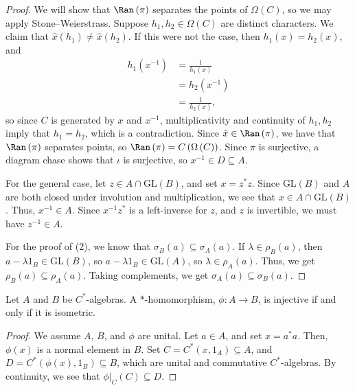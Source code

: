 \documentclass[10pt]{mypackage}
\newcommand{\GL}{\text{GL}}
\begin{document}
\begin{proof}
  We will show that $\Ran\left(\pi\right)$ separates the points of $\Omega\left(C\right)$, so we may apply Stone--Weierstrass. Suppose $h_1,h_2\in \Omega\left(C\right)$ are distinct characters. We claim that $\hat{x}\left(h_1\right) \neq \hat{x}\left(h_2\right)$. If this were not the case, then $h_1\left(x\right) = h_2\left(x\right)$, and
  \begin{align*}
    h_1\left(x^{-1}\right) &= \frac{1}{h_1\left(x\right)}\\
                           &= h_2\left(x^{-1}\right)\\
                           &= \frac{1}{h_2\left(x\right)},
  \end{align*}
  so since $C$ is generated by $x$ and $x^{-1}$, multiplicativity and continuity of $h_1,h_2$ imply that $h_1 = h_2$, which is a contradiction. Since $\hat{x}\in \Ran\left(\pi\right)$, we have that $\Ran\left(\pi\right)$ separates points, so $\Ran\left(\pi\right) = C\left(\Omega\left(C\right)\right)$. Since $\pi$ is surjective, a diagram chase shows that $\iota$ is surjective, so $x^{-1}\in D\subseteq A$.\newline

  For the general case, let $z\in A\cap \GL\left(B\right)$, and set $x = z^{\ast}z$. Since $\GL\left(B\right)$ and $A$ are both closed under involution and multiplication, we see that $x\in A\cap \GL\left(B\right)$. Thus, $x^{-1}\in A$. Since $x^{-1}z^{\ast}$ is a left-inverse for $z$, and $z$ is invertible, we must have $z^{-1}\in A$.\newline

  For the proof of (2), we know that $\sigma_B\left(a\right)\subseteq\sigma_A\left(a\right)$. If $\lambda\in \rho_B\left(a\right)$, then $a-\lambda 1_B\in \GL\left(B\right)$, so $a - \lambda 1_B\in \GL\left(A\right)$, so $\lambda\in \rho_A\left(a\right)$. Thus, we get $\rho_B\left(a\right)\subseteq \rho_A\left(a\right)$. Taking complements, we get $\sigma_A\left(a\right)\subseteq \sigma_B\left(a\right)$.
\end{proof}
\begin{proposition}
  Let $A$ and $B$ be $C^{\ast}$-algebras. A $\ast$-homomorphism, $\phi\colon A\rightarrow B$, is injective if and only if it is isometric.
\end{proposition}
\begin{proof}
  We assume $A$, $B$, and $\phi$ are unital. Let $a\in A$, and set $x = a^{\ast}a$. Then, $\phi(x)$ is a normal element in $B$. Set $C = C^{\ast}\left(x,1_A\right)\subseteq A$, and $D = C^{\ast}\left(\phi(x),1_B\right)\subseteq B$, which are unital and commutative $C^{\ast}$-algebras. By continuity, we see that $\phi|_{C}\left(C\right)\subseteq D$.
\end{proof}
\end{document}
